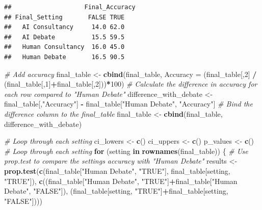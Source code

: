 \documentclass[
]{article}
\newenvironment{Shaded}{\begin{snugshade}}{\end{snugshade}}
\newcommand{\AttributeTok}[1]{\textcolor[rgb]{0.13,0.29,0.53}{#1}}
\newcommand{\CommentTok}[1]{\textcolor[rgb]{0.56,0.35,0.01}{\textit{#1}}}
\newcommand{\ControlFlowTok}[1]{\textcolor[rgb]{0.13,0.29,0.53}{\textbf{#1}}}
\newcommand{\DecValTok}[1]{\textcolor[rgb]{0.00,0.00,0.81}{#1}}
\newcommand{\FunctionTok}[1]{\textcolor[rgb]{0.13,0.29,0.53}{\textbf{#1}}}
\newcommand{\NormalTok}[1]{#1}
\newcommand{\OtherTok}[1]{\textcolor[rgb]{0.56,0.35,0.01}{#1}}
\newcommand{\SpecialCharTok}[1]{\textcolor[rgb]{0.81,0.36,0.00}{\textbf{#1}}}
\newcommand{\StringTok}[1]{\textcolor[rgb]{0.31,0.60,0.02}{#1}}
\begin{document}
\begin{verbatim}
##                    Final_Accuracy
## Final_Setting       FALSE TRUE
##   AI Consultancy     14.0 62.0
##   AI Debate          15.5 59.5
##   Human Consultancy  16.0 45.0
##   Human Debate       16.5 90.5
\end{verbatim}

\begin{Shaded}
\begin{Highlighting}[]
\CommentTok{\# Add accuracy}
\NormalTok{final\_table }\OtherTok{\textless{}{-}} \FunctionTok{cbind}\NormalTok{(final\_table, }\AttributeTok{Accuracy =}\NormalTok{ (final\_table[,}\DecValTok{2}\NormalTok{] }\SpecialCharTok{/}\NormalTok{ (final\_table[,}\DecValTok{1}\NormalTok{]}\SpecialCharTok{+}\NormalTok{final\_table[,}\DecValTok{2}\NormalTok{]))}\SpecialCharTok{*}\DecValTok{100}\NormalTok{)}
\CommentTok{\# Calculate the difference in accuracy for each row compared to "Human Debate"}
\NormalTok{difference\_with\_debate }\OtherTok{\textless{}{-}}\NormalTok{ final\_table[,}\StringTok{"Accuracy"}\NormalTok{] }\SpecialCharTok{{-}}\NormalTok{ final\_table[}\StringTok{"Human Debate"}\NormalTok{, }\StringTok{"Accuracy"}\NormalTok{]}
\CommentTok{\# Bind the difference column to the final\_table}
\NormalTok{final\_table }\OtherTok{\textless{}{-}} \FunctionTok{cbind}\NormalTok{(final\_table, difference\_with\_debate)}

\CommentTok{\# Loop through each setting}
\NormalTok{ci\_lowers }\OtherTok{\textless{}{-}} \FunctionTok{c}\NormalTok{()}
\NormalTok{ci\_uppers }\OtherTok{\textless{}{-}} \FunctionTok{c}\NormalTok{()}
\NormalTok{p\_values }\OtherTok{\textless{}{-}} \FunctionTok{c}\NormalTok{()}
\CommentTok{\# Loop through each setting}
\ControlFlowTok{for}\NormalTok{ (setting }\ControlFlowTok{in} \FunctionTok{rownames}\NormalTok{(final\_table)) \{}
  \CommentTok{\# Use prop.test to compare the setting\textquotesingle{}s accuracy with "Human Debate"}
\NormalTok{  results }\OtherTok{\textless{}{-}} \FunctionTok{prop.test}\NormalTok{(}\FunctionTok{c}\NormalTok{(final\_table[}\StringTok{"Human Debate"}\NormalTok{, }\StringTok{"TRUE"}\NormalTok{], final\_table[setting, }\StringTok{"TRUE"}\NormalTok{]), }\FunctionTok{c}\NormalTok{((final\_table[}\StringTok{"Human Debate"}\NormalTok{, }\StringTok{"TRUE"}\NormalTok{]}\SpecialCharTok{+}\NormalTok{final\_table[}\StringTok{"Human Debate"}\NormalTok{, }\StringTok{"FALSE"}\NormalTok{]), (final\_table[setting, }\StringTok{"TRUE"}\NormalTok{]}\SpecialCharTok{+}\NormalTok{final\_table[setting, }\StringTok{"FALSE"}\NormalTok{])))}
  

\end{Highlighting}
\end{Shaded}
\end{document}
